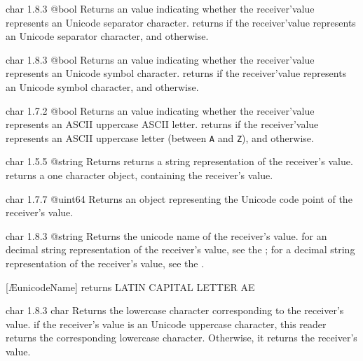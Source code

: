 {char}
{1.8.3}
{@bool}
{Returns an  value indicating whether the receiver'value represents an Unicode separator character.}
{returns  if the receiver'value represents an Unicode separator character, and  otherwise.}






{char}
{1.8.3}
{@bool}
{Returns an  value indicating whether the receiver'value represents an Unicode symbol character.}
{returns  if the receiver'value represents an Unicode symbol character, and  otherwise.}









{char}
{1.7.2}
{@bool}
{Returns an  value indicating whether the receiver'value represents an ASCII uppercase ASCII letter.}
{returns  if the receiver'value represents an ASCII uppercase letter (between \texttt{\textquotesingle A\textquotesingle} and \texttt{\textquotesingle Z\textquotesingle}), and  otherwise.}





{char}
{1.5.5}
{@string}
{Returns returns a string representation of the receiver's value.}
{returns a one character  object, containing the receiver's value.}




{char}
{1.7.7}
{@uint64}
{Returns an  object representing the Unicode code point of the receiver's value.}
{}




{char}
{1.8.3}
{@string}
{Returns the unicode name of the receiver's value.}
{for an decimal string representation of the receiver's value, see the ; for a decimal string representation of the receiver's value, see the .}

\exempleUneLigne
{}
{[\textquotesingle \AE \textquotesingle unicodeName] returns \textquotedbl LATIN CAPITAL LETTER AE \textquotedbl}




{char}
{1.8.3}
{char}
{Returns the lowercase character corresponding to the receiver's value.}
{if the receiver's value is an Unicode uppercase character, this reader returns the corresponding lowercase character. Otherwise, it returns the receiver's value.}

